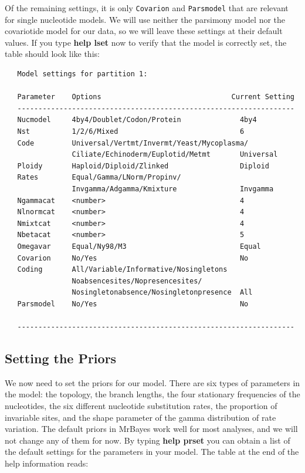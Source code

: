 \documentclass[12pt]{book}
\begin{document}
Of the remaining settings, it is only \texttt{Covarion} and \texttt{Parsmodel} that are relevant for single
 nucleotide models. We will use neither the parsimony model nor the covariotide model for our data, so we
 will leave these settings at their default values. If you type \textbf{help lset} now to verify that the
 model is correctly set, the table should look like this:

\begin{singlespacing}
\small
\begin{verbatim}
   Model settings for partition 1:

   Parameter    Options                               Current Setting
   ------------------------------------------------------------------
   Nucmodel     4by4/Doublet/Codon/Protein              4by4
   Nst          1/2/6/Mixed                             6
   Code         Universal/Vertmt/Invermt/Yeast/Mycoplasma/
                Ciliate/Echinoderm/Euplotid/Metmt       Universal
   Ploidy       Haploid/Diploid/Zlinked                 Diploid
   Rates        Equal/Gamma/LNorm/Propinv/
                Invgamma/Adgamma/Kmixture               Invgamma
   Ngammacat    <number>                                4
   Nlnormcat    <number>                                4
   Nmixtcat     <number>                                4
   Nbetacat     <number>                                5
   Omegavar     Equal/Ny98/M3                           Equal
   Covarion     No/Yes                                  No
   Coding       All/Variable/Informative/Nosingletons
                Noabsencesites/Nopresencesites/
                Nosingletonabsence/Nosingletonpresence  All
   Parsmodel    No/Yes                                  No

   ------------------------------------------------------------------
\end{verbatim}
\normalsize
\end{singlespacing}

\subsection{Setting the Priors}

We now need to set the priors for our model. There are six types of parameters in the model: the topology,
 the branch lengths, the four stationary frequencies of the nucleotides, the six different nucleotide
 substitution rates, the proportion of invariable sites, and the shape parameter of the gamma distribution
 of rate variation. The default priors in MrBayes work well for most analyses, and we will not change any
 of them for now. By typing \textbf{help prset} you can obtain a list of the default settings for the
 parameters in your model. The table at the end of the help information reads:
\end{document}
